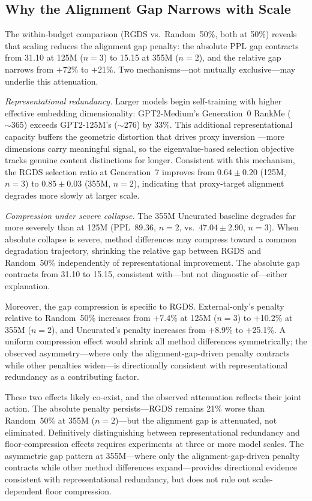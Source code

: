 \subsection{Why the Alignment Gap Narrows with Scale}
\label{sec:discuss_scaling}

The within-budget comparison (RGDS vs.\ Random~50\%, both at 50\%) reveals that scaling reduces the alignment gap penalty: the absolute PPL gap contracts from 31.10 at 125M ($n{=}3$) to 15.15 at 355M ($n{=}2$), and the relative gap narrows from $+$72\% to $+$21\%.%
Two mechanisms---not mutually exclusive---may underlie this attenuation.

\emph{Representational redundancy.} Larger models begin self-training with higher effective embedding dimensionality: GPT2-Medium's Generation~0 RankMe (${\sim}365$) exceeds GPT2-125M's (${\sim}276$) by 33\%. This additional representational capacity buffers the geometric distortion that drives proxy inversion \citep{jing2022understanding}---more dimensions carry meaningful signal, so the eigenvalue-based selection objective tracks genuine content distinctions for longer. Consistent with this mechanism, the RGDS selection ratio at Generation~7 improves from $0.64 \pm 0.20$ (125M, $n{=}3$) to $0.85 \pm 0.03$ (355M, $n{=}2$), indicating that proxy-target alignment degrades more slowly at larger scale.

\emph{Compression under severe collapse.} The 355M Uncurated baseline degrades far more severely than at 125M (PPL~$89.36$, $n{=}2$, vs.\ $47.04 \pm 2.90$, $n{=}3$). When absolute collapse is severe, method differences may compress toward a common degradation trajectory, shrinking the relative gap between RGDS and Random~50\% independently of representational improvement. The absolute gap contracts from 31.10 to 15.15, consistent with---but not diagnostic of---either explanation.

Moreover, the gap compression is specific to RGDS. External-only's penalty relative to Random~50\% increases from $+$7.4\% at 125M ($n{=}3$) to $+$10.2\% at 355M ($n{=}2$), and Uncurated's penalty increases from $+$8.9\% to $+$25.1\%.%
A uniform compression effect would shrink all method differences symmetrically; the observed asymmetry---where only the alignment-gap-driven penalty contracts while other penalties widen---is directionally consistent with representational redundancy as a contributing factor.

These two effects likely co-exist, and the observed attenuation reflects their joint action. The absolute penalty persists---RGDS remains 21\% worse than Random~50\% at 355M ($n{=}2$)---but the alignment gap is attenuated, not eliminated. Definitively distinguishing between representational redundancy and floor-compression effects requires experiments at three or more model scales. The asymmetric gap pattern at 355M---where only the alignment-gap-driven penalty contracts while other method differences expand---provides directional evidence consistent with representational redundancy, but does not rule out scale-dependent floor compression.%

